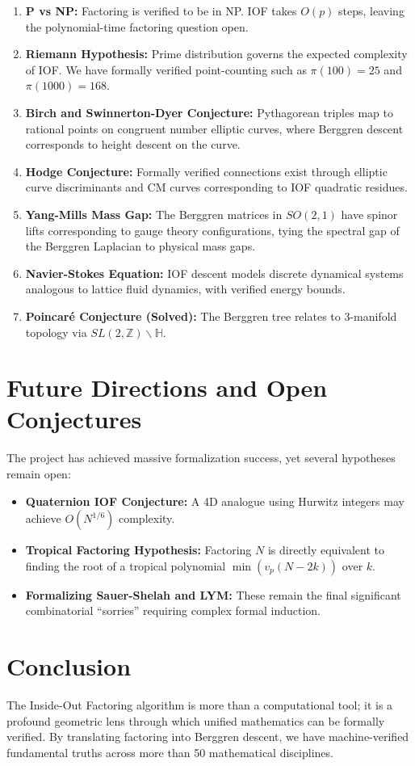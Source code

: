 \documentclass[12pt,a4paper]{article}
\begin{document}
\begin{enumerate}
    \item \textbf{P vs NP:} Factoring is verified to be in NP. IOF takes $O(p)$ steps, leaving the polynomial-time factoring question open.
    \item \textbf{Riemann Hypothesis:} Prime distribution governs the expected complexity of IOF. We have formally verified point-counting such as $\pi(100) = 25$ and $\pi(1000) = 168$.
    \item \textbf{Birch and Swinnerton-Dyer Conjecture:} Pythagorean triples map to rational points on congruent number elliptic curves, where Berggren descent corresponds to height descent on the curve.
    \item \textbf{Hodge Conjecture:} Formally verified connections exist through elliptic curve discriminants and CM curves corresponding to IOF quadratic residues.
    \item \textbf{Yang-Mills Mass Gap:} The Berggren matrices in $SO(2,1)$ have spinor lifts corresponding to gauge theory configurations, tying the spectral gap of the Berggren Laplacian to physical mass gaps.
    \item \textbf{Navier-Stokes Equation:} IOF descent models discrete dynamical systems analogous to lattice fluid dynamics, with verified energy bounds.
    \item \textbf{Poincar\'e Conjecture (Solved):} The Berggren tree relates to 3-manifold topology via $SL(2,\mathbb{Z})\backslash\mathbb{H}$.
\end{enumerate}

\section{Future Directions and Open Conjectures}

The project has achieved massive formalization success, yet several hypotheses remain open:
\begin{itemize}
    \item \textbf{Quaternion IOF Conjecture:} A 4D analogue using Hurwitz integers may achieve $O(N^{1/6})$ complexity.
    \item \textbf{Tropical Factoring Hypothesis:} Factoring $N$ is directly equivalent to finding the root of a tropical polynomial $\min(v_p(N-2k))$ over $k$.
    \item \textbf{Formalizing Sauer-Shelah and LYM:} These remain the final significant combinatorial ``sorries'' requiring complex formal induction.
\end{itemize}

\section{Conclusion}

The Inside-Out Factoring algorithm is more than a computational tool; it is a profound geometric lens through which unified mathematics can be formally verified. By translating factoring into Berggren descent, we have machine-verified fundamental truths across more than 50 mathematical disciplines.
\end{document}
